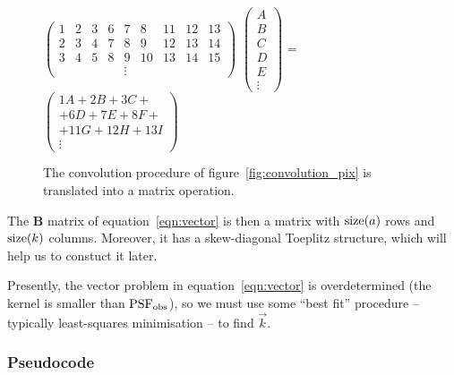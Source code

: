 \documentclass[letterpaper, 11pt]{article}
\def\psfobs{\ensuremath{{\rm PSF_{obs}}}\xspace}
\begin{document}
\begin{figure}
	\begin{center}
	$\begin{pmatrix}
		1&2&3&6&7&8&11&12&13\\
		2&3&4&7&8&9&12&13&14\\
		3&4&5&8&9&10&13&14&15\\
		&&&&\vdots
	\end{pmatrix}$
	$\begin{pmatrix}
		A\\B\\C\\
		D\\E\\\vdots
	\end{pmatrix}$
	\hspace{1mm} = \hspace{1mm}
	$\begin{pmatrix}
		1A+2B+3C+\\+6D+7E+8F+\\+11G+12H+13I \\
		\vdots
	\end{pmatrix}$\end{center}
	\caption{The convolution procedure of figure~\ref{fig:convolution_pix} is translated into a matrix operation.}
	\label{fig:convolution_linalg}
\end{figure}


The $\mathbf B$ matrix of equation~\ref{eqn:vector} is then a matrix with ${\rm size}(a)$ rows and ${\rm size}(k)$ columns. Moreover, it has a skew-diagonal Toeplitz structure, which will help us to constuct it later.

Presently, the vector problem in equation~\ref{eqn:vector} is overdetermined (the kernel is smaller than \psfobs), so we must use some ``best fit'' procedure -- typically least-squares minimisation -- to find $\vec k$.

\subsubsection{Pseudocode}
\end{document}

